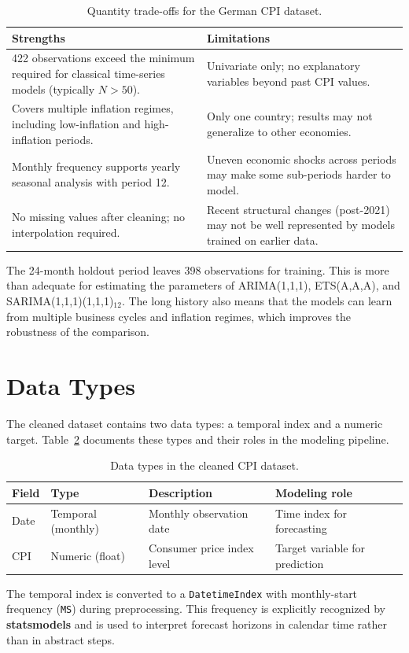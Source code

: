 \begin{table}[htbp]
	\centering
	\caption{Quantity trade-offs for the German CPI dataset.}
	\label{tab:quantity-tradeoffs}
	\begin{tabular}{p{6.5cm}p{6.5cm}}
		\hline
		\textbf{Strengths} & \textbf{Limitations} \\
		\hline
		422 observations exceed the minimum required for classical time-series models (typically $N > 50$). & Univariate only; no explanatory variables beyond past CPI values. \\
		Covers multiple inflation regimes, including low-inflation and high-inflation periods. & Only one country; results may not generalize to other economies. \\
		Monthly frequency supports yearly seasonal analysis with period 12. & Uneven economic shocks across periods may make some sub-periods harder to model. \\
		No missing values after cleaning; no interpolation required. & Recent structural changes (post-2021) may not be well represented by models trained on earlier data. \\
		\hline
	\end{tabular}
\end{table}

The 24-month holdout period leaves 398 observations for training. This is more than adequate for estimating the parameters of ARIMA(1,1,1), ETS(A,A,A), and SARIMA(1,1,1)(1,1,1)$_{12}$. The long history also means that the models can learn from multiple business cycles and inflation regimes, which improves the robustness of the comparison.

\section{Data Types}

The cleaned dataset contains two data types: a temporal index and a numeric target. Table~\ref{tab:cpi-data-types} documents these types and their roles in the modeling pipeline.

\begin{table}[htbp]
	\centering
	\caption{Data types in the cleaned CPI dataset.}
	\label{tab:cpi-data-types}
	\begin{tabular}{llll}
		\hline
		\textbf{Field} & \textbf{Type} & \textbf{Description} & \textbf{Modeling role} \\
		\hline
		Date & Temporal (monthly) & Monthly observation date & Time index for forecasting \\
		CPI & Numeric (float) & Consumer price index level & Target variable for prediction \\
		\hline
	\end{tabular}
\end{table}

The temporal index is converted to a \texttt{DatetimeIndex} with monthly-start frequency (\texttt{MS}) during preprocessing. This frequency is explicitly recognized by \textbf{statsmodels} and is used to interpret forecast horizons in calendar time rather than in abstract steps.
